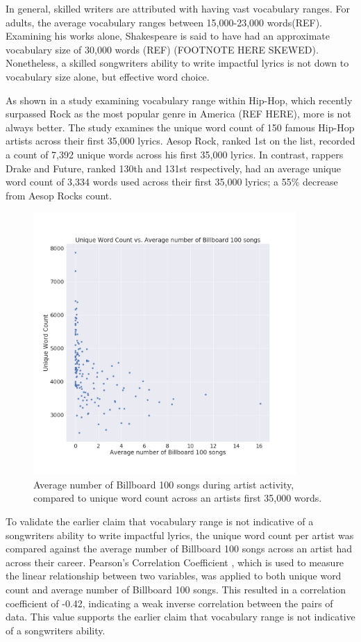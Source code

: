 \noindent
\newline
In general, skilled writers are attributed with having vast vocabulary ranges. For adults, the average vocabulary ranges between 15,000-23,000 words(REF). Examining his works alone, Shakespeare is said to have had an approximate vocabulary size of 30,000 words (REF) (FOOTNOTE HERE SKEWED). Nonetheless, a skilled songwriters ability to write impactful lyrics is not down to vocabulary size alone, but effective word choice.
 
\noindent
\newline
As shown in a study examining vocabulary range within Hip-Hop, which recently surpassed Rock as the most popular genre in America (REF HERE), more is not always better. The study examines the unique word count of 150 famous Hip-Hop artists across their first 35,000 lyrics. Aesop Rock, ranked 1st on the list, recorded a count of 7,392 unique words across his first 35,000 lyrics. In contrast, rappers Drake and Future, ranked 130th and 131st respectively, had an average unique word count of 3,334 words used across their first 35,000 lyrics; a 55\% decrease from Aesop Rocks count. 
\begin{figure}[h]	
	\includegraphics[width=10cm, height=10cm]{./figures/fig1}
	\centering
	\caption{Average number of Billboard 100 songs during artist activity, compared to unique word count across an artists first 35,000 words.}
	\label{fig:fig1}
\end{figure}

\noindent
\newline
To validate the earlier claim that vocabulary range is not indicative of a songwriters ability to write impactful lyrics, the unique word count per artist was compared against the average number of Billboard 100 songs across an artist had across their career. Pearson's Correlation Coefficient , which is used to measure the linear relationship between two variables, was applied to both unique word count and average number of Billboard 100 songs. This resulted in a correlation coefficient of -0.42, indicating a weak inverse correlation between the pairs of data. This value supports the earlier claim that vocabulary range is not indicative of a songwriters ability.

